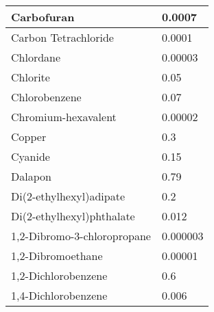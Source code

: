 \begin{table}[!htbp]
\begin{tabular}{|m{9cm}|m{5cm}|}
Carbofuran                                                          & 0.0007                                                  \\ \hline
Carbon Tetrachloride                                                & 0.0001                                                  \\ \hline
Chlordane                                                           & 0.00003                                                 \\ \hline
Chlorite                                                            & 0.05                                                    \\ \hline
Chlorobenzene                                                       & 0.07                                                    \\ \hline
Chromium-hexavalent                                                 & 0.00002                                                 \\ \hline
Copper                                                              & 0.3                                                     \\ \hline
Cyanide                                                             & 0.15                                                    \\ \hline
Dalapon                                                             & 0.79                                                    \\ \hline
Di(2-ethylhexyl)adipate                                             & 0.2                                                     \\ \hline
Di(2-ethylhexyl)phthalate                                           & 0.012                                                   \\ \hline
1,2-Dibromo-3-chloropropane                                         & 0.000003                                                \\ \hline
1,2-Dibromoethane                                                   & 0.00001                                                 \\ \hline
1,2-Dichlorobenzene                                                 & 0.6                                                     \\ \hline
1,4-Dichlorobenzene                                                 & 0.006                                                   \\ \hline

\end{tabular}
\end{table}
